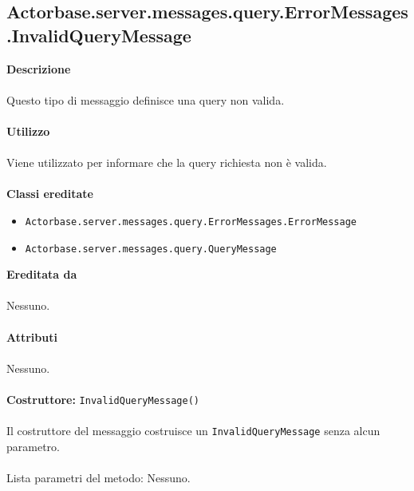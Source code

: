 \documentclass[a4paper]{article}
\begin{document}
	\subsection{Actorbase.server.messages.query.ErrorMessages.InvalidQueryMessage}
		\textbf{Descrizione}
			\\ \\
			Questo tipo di messaggio definisce una query non valida.
			\\ \\
		\textbf{Utilizzo}
			\\ \\
			Viene utilizzato per informare che la query richiesta non è valida.
			\\ \\
		\textbf{Classi ereditate}
			\begin{itemize}
				\item \texttt{Actorbase.server.messages.query.ErrorMessages.ErrorMessage}
				\item \texttt{Actorbase.server.messages.query.QueryMessage}
			\end{itemize}
		\textbf{Ereditata da}
			\\ \\
			Nessuno.
			\\ \\
		\textbf{Attributi}
			\\ \\
			Nessuno.
			\\ \\
		\textbf{Costruttore: } \texttt{InvalidQueryMessage()}
			\\ \\
			Il costruttore del messaggio costruisce un \texttt{InvalidQueryMessage} senza alcun parametro.
			\\ \\
			Lista parametri del metodo: Nessuno.
			
\end{document}
